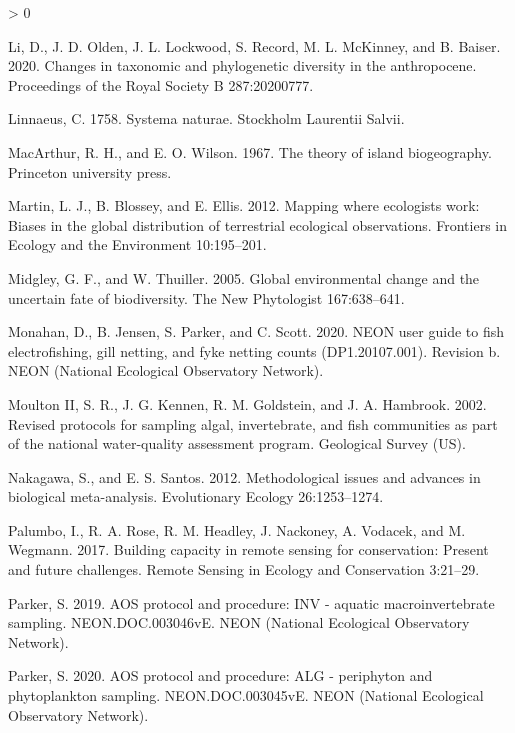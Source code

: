 \documentclass[
  12pt,
]{article}
\newlength{\cslhangindent}
\newenvironment{CSLReferences}[2] %
 {%
  \setlength{\parindent}{0pt}
  \ifodd #1 \everypar{\setlength{\hangindent}{\cslhangindent}}\ignorespaces\fi
  \ifnum #2 > 0
  \setlength{\parskip}{#2\baselineskip}
  \fi
 }%
 {}
\begin{document}
\begin{CSLReferences}{1}{0}
\leavevmode\hypertarget{ref-li2020changes}{}%
Li, D., J. D. Olden, J. L. Lockwood, S. Record, M. L. McKinney, and B. Baiser. 2020. Changes in taxonomic and phylogenetic diversity in the anthropocene. Proceedings of the Royal Society B 287:20200777.

\leavevmode\hypertarget{ref-linnaeus1758systema}{}%
Linnaeus, C. 1758. Systema naturae. Stockholm Laurentii Salvii.

\leavevmode\hypertarget{ref-macarthur1967theory}{}%
MacArthur, R. H., and E. O. Wilson. 1967. The theory of island biogeography. Princeton university press.

\leavevmode\hypertarget{ref-martin2012mapping}{}%
Martin, L. J., B. Blossey, and E. Ellis. 2012. Mapping where ecologists work: Biases in the global distribution of terrestrial ecological observations. Frontiers in Ecology and the Environment 10:195--201.

\leavevmode\hypertarget{ref-midgley2005global}{}%
Midgley, G. F., and W. Thuiller. 2005. Global environmental change and the uncertain fate of biodiversity. The New Phytologist 167:638--641.

\leavevmode\hypertarget{ref-Monahan2020}{}%
Monahan, D., B. Jensen, S. Parker, and C. Scott. 2020. NEON user guide to fish electrofishing, gill netting, and fyke netting counts (DP1.20107.001). Revision b. NEON (National Ecological Observatory Network).

\leavevmode\hypertarget{ref-moulton2002revised}{}%
Moulton II, S. R., J. G. Kennen, R. M. Goldstein, and J. A. Hambrook. 2002. Revised protocols for sampling algal, invertebrate, and fish communities as part of the national water-quality assessment program. Geological Survey (US).

\leavevmode\hypertarget{ref-nakagawa2012methodological}{}%
Nakagawa, S., and E. S. Santos. 2012. Methodological issues and advances in biological meta-analysis. Evolutionary Ecology 26:1253--1274.

\leavevmode\hypertarget{ref-palumbo2017building}{}%
Palumbo, I., R. A. Rose, R. M. Headley, J. Nackoney, A. Vodacek, and M. Wegmann. 2017. Building capacity in remote sensing for conservation: Present and future challenges. Remote Sensing in Ecology and Conservation 3:21--29.

\leavevmode\hypertarget{ref-Parker2019}{}%
Parker, S. 2019. AOS protocol and procedure: INV - aquatic macroinvertebrate sampling. NEON.DOC.003046vE. NEON (National Ecological Observatory Network).

\leavevmode\hypertarget{ref-Parker2020}{}%
Parker, S. 2020. AOS protocol and procedure: ALG - periphyton and phytoplankton sampling. NEON.DOC.003045vE. NEON (National Ecological Observatory Network).


\end{CSLReferences}
\end{document}
